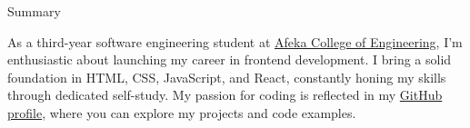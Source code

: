 \documentclass{resume}
\begin{document}

 \begin{rSection}{Summary}

  As a third-year software engineering student at \href{https://www.afeka.ac.il/}{Afeka College of Engineering}, I'm enthusiastic about launching my
  career in frontend development. I bring a solid foundation in HTML, CSS, JavaScript, and React,
  constantly honing my skills through dedicated self-study.
  My passion for coding is reflected in my \href{https://github.com/Asnvir}{GitHub profile}, where you can explore my projects and
  code examples.


 \end{rSection}














\end{document}
